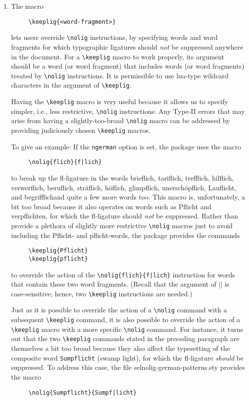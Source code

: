 \documentclass[12pt]{article}
\newcommand{\pkg}[1]{\textsf{#1}}
\newcommand{\opt}[1]{\texttt{#1}}
\newcommand{\cmmd}[1]{\texttt{\textbackslash #1}}
\begin{document}
\begin{enumerate}
The arguments of the \cmmd{nolig} command (as well as of the package's other user commands) are case-sensitive. 

\item The macro 
\begin{Verbatim}
     \keeplig{<word-fragment>}
\end{Verbatim}
lets users override \cmmd{nolig} instructions, by specifying words and word fragments for which typographic ligatures should \emph{not} be suppressed anywhere in the document. For a \cmmd{keeplig} macro to work properly, its argument should be a word (or word fragment) that includes words (or word fragments) treated by \cmmd{nolig} instructions. It is permissible to use lua-type wildcard characters in the argument of \cmmd{keeplig}. 

Having the \cmmd{keeplig} macro is very useful because it allows us to specify simpler, i.e., less restrictive, \cmmd{nolig} instructions: Any Type-II errors that may arise from having a slightly-too-broad \cmmd{nolig} macro can be addressed by providing judiciously chosen \cmmd{keeplig} macros.

\enlargethispage{1\baselineskip}

To give an example: If the \opt{ngerman} option is set, the package uses the macro 
\begin{Verbatim}
     \nolig{flich}{f|lich}
\end{Verbatim}
to break up the fl-ligature in the words brieflich, tariflich, trefflich, hilflich, verwerflich, beruflich, sträflich, höflich, glimpflich, unerschöpflich, Lauflicht, and begrifflich\textemdash and quite a few more words too. This macro is, unfortunately, a bit too broad because it also operates on words such as Pf\breaklig licht and verpf\breaklig lichten, for which the fl-ligature should \emph{not} be suppressed. Rather than provide a plethora of slightly more restrictive \cmmd{nolig} macros just to avoid including the Pflicht- and pflicht-words, the package provides the commands
\begin{Verbatim}
     \keeplig{Pflicht}
     \keeplig{pflicht}
\end{Verbatim}
to override the action of the \Verb+\nolig{flich}{f|lich}+ instruction for words that contain these two word fragments. (Recall that the argument of |\keeplig| is case-sensitive; hence, two \cmmd{keeplig} instructions are needed.)

Just as it is possible to override the action of a \cmmd{nolig} command with a subsequent \cmmd{keeplig} command, it is also possible to override the action of a \cmmd{keeplig} macro with a more specific \cmmd{nolig} command. For instance, it turns out that the two \cmmd{keeplig} commands stated in the preceding paragraph are themselves a bit too broad because they also affect the typesetting of the composite word \opt{Sumpflicht} (swamp light), for which the fl-ligature \emph{should} be suppressed. To address this case, the file \pkg{selnolig-german-patterns.sty} provides the macro 
\begin{Verbatim}
     \nolig{Sumpflicht}{Sumpf|licht}
\end{Verbatim}


\end{enumerate}
\end{document}

